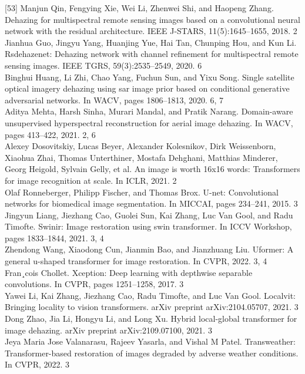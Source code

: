 \documentclass{article}
\begin{document}
[53] Manjun Qin, Fengying Xie, Wei Li, Zhenwei Shi, and Haopeng Zhang. Dehazing for multispectral remote sensing images based on a convolutional neural network with the residual architecture. IEEE J-STARS, 11(5):1645–1655, 2018. 2\\
[54] Jianhua Guo, Jingyu Yang, Huanjing Yue, Hai Tan, Chunping Hou, and Kun Li. Rsdehazenet: Dehazing network with channel refinement for multispectral remote sensing images. IEEE TGRS, 59(3):2535–2549, 2020. 6\\
[55] Binghui Huang, Li Zhi, Chao Yang, Fuchun Sun, and Yixu Song. Single satellite optical imagery dehazing using sar image prior based on conditional generative adversarial networks. In WACV, pages 1806–1813, 2020. 6, 7\\
[56] Aditya Mehta, Harsh Sinha, Murari Mandal, and Pratik Narang. Domain-aware unsupervised hyperspectral reconstruction for aerial image dehazing. In WACV, pages 413–422, 2021. 2, 6\\
[57] Alexey Dosovitskiy, Lucas Beyer, Alexander Kolesnikov, Dirk Weissenborn, Xiaohua Zhai, Thomas Unterthiner, Mostafa Dehghani, Matthias Minderer, Georg Heigold, Sylvain Gelly, et al. An image is worth 16x16 words: Transformers for image recognition at scale. In ICLR, 2021. 2\\
[58] Olaf Ronneberger, Philipp Fischer, and Thomas Brox. U-net: Convolutional networks for biomedical image segmentation. In MICCAI, pages 234–241, 2015. 3\\
[59] Jingyun Liang, Jiezhang Cao, Guolei Sun, Kai Zhang, Luc Van Gool, and Radu Timofte. Swinir: Image restoration using swin transformer. In ICCV Workshop, pages 1833–1844, 2021. 3, 4\\
[60] Zhendong Wang, Xiaodong Cun, Jianmin Bao, and Jianzhuang Liu. Uformer: A general u-shaped transformer for image restoration. In CVPR, 2022. 3, 4\\
[61] Fran¸cois Chollet. Xception: Deep learning with depthwise separable convolutions. In CVPR, pages 1251–1258, 2017. 3\\
[62] Yawei Li, Kai Zhang, Jiezhang Cao, Radu Timofte, and Luc Van Gool. Localvit: Bringing locality to vision transformers. arXiv preprint arXiv:2104.05707, 2021. 3\\
[63] Dong Zhao, Jia Li, Hongyu Li, and Long Xu. Hybrid local-global transformer for image dehazing. arXiv preprint arXiv:2109.07100, 2021. 3\\
[64] Jeya Maria Jose Valanarasu, Rajeev Yasarla, and Vishal M Patel. Transweather: Transformer-based restoration of images degraded by adverse weather conditions. In CVPR, 2022. 3\\
\end{document}

